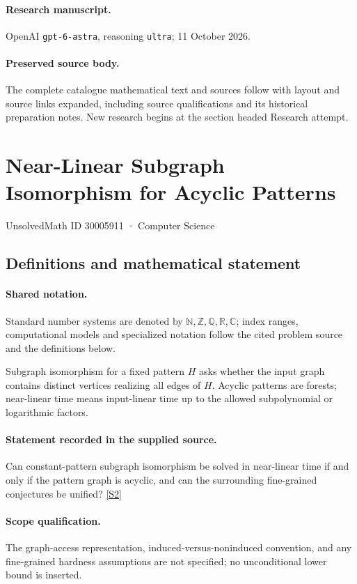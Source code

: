 \documentclass[11pt]{article}
\begin{document}
\paragraph{Research manuscript.} OpenAI \texttt{gpt-6-astra}, reasoning \texttt{ultra}; 11 October 2026.
\paragraph{Preserved source body.} The complete catalogue mathematical text and sources follow with layout and source links expanded, including source qualifications and its historical preparation notes. New research begins at the section headed Research attempt.

\section{Near-Linear Subgraph Isomorphism for Acyclic Patterns}\label{30005911}
{\small UnsolvedMath ID 30005911 · Computer Science}
\subsection{Definitions and mathematical statement}

\paragraph{Shared notation.}Standard number systems are denoted by $\mathbb N,\mathbb Z,\mathbb Q,\mathbb R,\mathbb C$; index ranges, computational models and specialized notation follow the cited problem source and the definitions below.


Subgraph isomorphism for a fixed pattern $H$ asks whether the input graph contains distinct vertices realizing all edges of $H$. Acyclic patterns are forests; near-linear time means input-linear time up to the allowed subpolynomial or logarithmic factors.
\paragraph{Statement recorded in the supplied source.}
Can constant-pattern subgraph isomorphism be solved in near-linear time if and only if the pattern graph is acyclic, and can the surrounding fine-grained conjectures be unified? \href{https://doi.org/10.4171/owr/2024/27}{[S2]}
\paragraph{Scope qualification.}
The graph-access representation, induced-versus-noninduced convention, and any fine-grained hardness assumptions are not specified; no unconditional lower bound is inserted.
\end{document}
